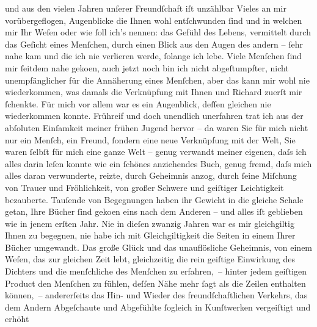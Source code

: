 \begin{ledgroupsized}[t]{13cm}
               und aus den vielen Jahren unſerer Freundſchaft iſt unzählbar Vieles an mir
               vorübergeflogen, Augenblicke die Ihnen wohl entſchwunden ſind und in welchen mir Ihr
               Weſen oder wie ſoll ich’s nennen: das Gefühl des Lebens, vermittelt durch das Geſicht
               eines Menſchen, durch einen Blick aus den Augen des andern – ſehr nahe kam und die
               ich nie verlieren werde, ſolange ich lebe. Viele Menſchen ſind mir ſeitdem nahe
                  geko{\geminationm}en, auch jetzt noch bin ich nicht abgeſtumpfter,
               nicht unempfänglicher für die Annäherung eines Menſchen, aber das kann mir wohl nie
               wiederkommen, was damals die Verknüpfung mit Ihnen und Richard zuerſt mir ſchenkte. Für mich \introOben{}vor
                     allem\introOben{} war es ein Augenblick, deſſen {\pb}gleichen
               nie wiederkommen konnte. Frühreif und doch unendlich unerfahren trat ich aus der
               abſoluten Einſamkeit meiner frühen Jugend hervor – da waren Sie für mich nicht nur
               ein Menſch, ein Freund, ſondern eine neue Verknüpfung mit der Welt, Sie waren ſelbſt
               für mich eine ganze Welt –  genug verwandt meiner
               eigenen, daſs ich alles darin leſen konnte wie ein ſchönes anziehendes Buch, genug
               fremd, daſs mich alles daran verwunderte, reizte, durch Geheimnis anzog, durch ſeine
               Miſchung von Trauer und Fröhlichkeit, von großer Schwere und geiſtiger Leichtigkeit
               bezauberte. Tauſende von Begegnungen haben ihr Gewicht in die gleiche Schale getan,
               Ihre Bücher ſind geko{\geminationm}en eins nach dem Anderen – und
               alles iſt geblieben wie in jenem erſten Jahr. Nie in dieſen zwanzig Jahren war es mir
               gleichgiltig Ihnen zu begegnen, nie habe ich mit Gleichgiltigkeit die Seiten in einem
               Ihrer Bücher umgewandt.\pend
           \pstart
           {\pb}Das große Glück und das unauflösliche Geheimnis, von
               einem Weſen, das zur gleichen Zeit lebt, gleichzeitig die rein geiſtige Einwirkung
               des Dichters und die menſchliche des Menſchen zu erfahren, – hinter jedem geiſtigen
               Product den Menſchen zu fühlen, deſſen Nähe mehr ſagt als die Zeilen enthalten
               können, – andererſeits das Hin- und Wieder des freundſchaftlichen Verkehrs, das dem
               Andern Abgeſchaute und Abgefühlte ſogleich in Kunſtwerken vergeiſtigt und erhöht

\end{ledgroupsized}
